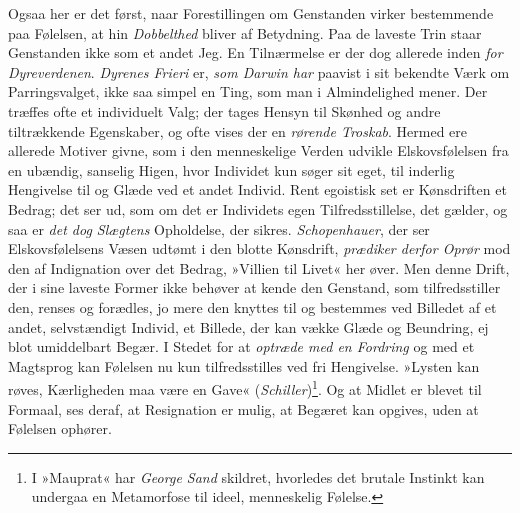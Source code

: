 \documentclass[12pt,a4paper,openany]{book}
\newcommand{\opage}[1]{\marginnote{\footnotesize\textit{[#1]}}}
\begin{document}
Ogsaa her er det først, naar Forestillingen om Genstanden virker
bestemmende paa Følelsen, at hin \emph{Dobbelthed} bliver af Betydning.
Paa de laveste Trin staar Genstanden ikke som et andet Jeg. En
Tilnærmelse er der dog allerede inden \emph{for Dyreverdenen}.
\emph{Dyrenes Frieri} er, \emph{som Darwin har} paavist i sit bekendte
Værk om Parringsvalget, ikke saa simpel en Ting, som man i Almindelighed
mener. Der træffes ofte et individuelt Valg; der tages Hensyn til
Skønhed og andre tiltrækkende Egenskaber, og ofte vises der en
\emph{rørende Troskab}. Hermed ere allerede Motiver givne, som i den
menneskelige Verden udvikle Elskovsfølelsen fra en ubændig, sanselig
Higen, hvor Individet kun søger sit eget, til inderlig Hengivelse til og
Glæde ved et andet Individ. Rent egoistisk set er Kønsdriften et Bedrag;
det ser ud, som om det er Individets egen Tilfredsstillelse, det gælder,
og saa er \emph{det dog Slægtens} Opholdelse, der sikres.
\emph{Schopenhauer}, der ser Elskovsfølelsens Væsen udtømt i den blotte
Kønsdrift, \emph{prædiker derfor Oprør} mod den af Indignation over det
Bedrag, »Villien til Livet« her øver. Men denne Drift, der i sine
laveste Former ikke behøver at kende den Genstand, som tilfredsstiller
den, renses og forædles, jo mere den knyttes til og bestemmes ved
Billedet af et andet, selvstændigt Individ, et Billede, der kan vække
Glæde og Beundring, ej blot umiddelbart Begær. I Stedet for at
\emph{optræde med en Fordring} og med et Magtsprog
\opage{302}kan Følelsen nu kun tilfredsstilles ved fri Hengivelse.
»Lysten kan røves, Kærligheden maa være en Gave«
(\emph{Schiller})\footnote[1]{I »Mauprat« har \emph{George Sand}
skildret, hvorledes det brutale Instinkt kan undergaa en Metamorfose til
ideel, menneskelig Følelse.}. Og at Midlet er blevet til Formaal, ses
deraf, at Resignation er mulig, at Begæret kan opgives, uden at Følelsen
ophører.
\end{document}
